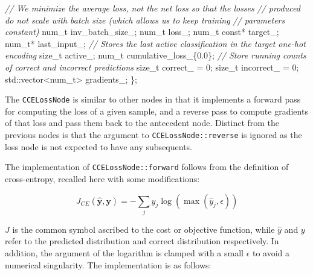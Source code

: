 \documentclass[
]{article}
\newenvironment{Shaded}{}{}
\newcommand{\AttributeTok}[1]{\textcolor[rgb]{0.49,0.56,0.16}{#1}}
\newcommand{\BuiltInTok}[1]{#1}
\newcommand{\CommentTok}[1]{\textcolor[rgb]{0.38,0.63,0.69}{\textit{#1}}}
\newcommand{\DataTypeTok}[1]{\textcolor[rgb]{0.56,0.13,0.00}{#1}}
\newcommand{\DecValTok}[1]{\textcolor[rgb]{0.25,0.63,0.44}{#1}}
\newcommand{\FloatTok}[1]{\textcolor[rgb]{0.25,0.63,0.44}{#1}}
\newcommand{\NormalTok}[1]{#1}
\newcommand{\VariableTok}[1]{\textcolor[rgb]{0.10,0.09,0.49}{#1}}
\begin{document}
\begin{Shaded}
\begin{Highlighting}[]
    \CommentTok{// We minimize the average loss, not the net loss so that the losses}
    \CommentTok{// produced do not scale with batch size (which allows us to keep training}
    \CommentTok{// parameters constant)}
    \DataTypeTok{num\_t} \VariableTok{inv\_batch\_size\_}\NormalTok{;}
    \DataTypeTok{num\_t} \VariableTok{loss\_}\NormalTok{;}
    \DataTypeTok{num\_t} \AttributeTok{const}\NormalTok{* }\VariableTok{target\_}\NormalTok{;}
    \DataTypeTok{num\_t}\NormalTok{* }\VariableTok{last\_input\_}\NormalTok{;}
    \CommentTok{// Stores the last active classification in the target one{-}hot encoding}
    \DataTypeTok{size\_t} \VariableTok{active\_}\NormalTok{;}
    \DataTypeTok{num\_t} \VariableTok{cumulative\_loss\_}\NormalTok{\{}\FloatTok{0.0}\NormalTok{\};}
    \CommentTok{// Store running counts of correct and incorrect predictions}
    \DataTypeTok{size\_t} \VariableTok{correct\_}\NormalTok{   = }\DecValTok{0}\NormalTok{;}
    \DataTypeTok{size\_t} \VariableTok{incorrect\_}\NormalTok{ = }\DecValTok{0}\NormalTok{;}
    \BuiltInTok{std::}\NormalTok{vector\textless{}}\DataTypeTok{num\_t}\NormalTok{\textgreater{} }\VariableTok{gradients\_}\NormalTok{;}
\NormalTok{\};}
\end{Highlighting}
\end{Shaded}

The \texttt{CCELossNode} is similar to other nodes in that it implements
a forward pass for computing the loss of a given sample, and a reverse
pass to compute gradients of that loss and pass them back to the
antecedent node. Distinct from the previous nodes is that the argument
to \texttt{CCELossNode::reverse} is ignored as the loss node is not
expected to have any subsequents.

The implementation of \texttt{CCELossNode::forward} follows from the
definition of cross-entropy, recalled here with some modifications:

\[J_{CE}(\hat{\mathbf{y}}, \mathbf{y}) = -\sum_j y_j \log{\left(\max(\hat{y}_j, \epsilon) \right)} \]

\(J\) is the common symbol ascribed to the cost or objective function,
while \(\hat{y}\) and \(y\) refer to the predicted distribution and
correct distribution respectively. In addition, the argument of the
logarithm is clamped with a small \(\epsilon\) to avoid a numerical
singularity. The implementation is as follows:
\end{document}
